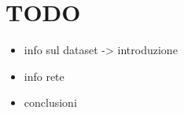 \chapter{TODO}
\begin{itemize}
	\item info sul dataset -> introduzione

	\item info rete
	
	\item conclusioni
\end{itemize}